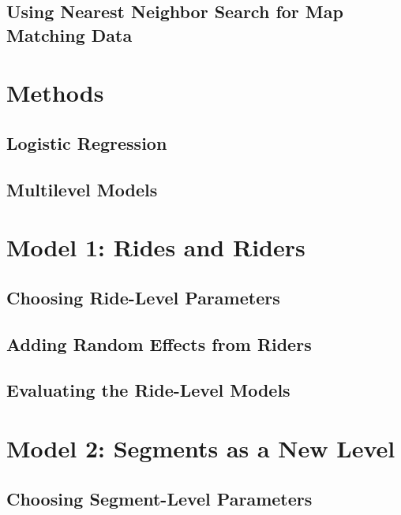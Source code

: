 \documentclass[12pt,twoside]{reedthesis}
\begin{document}
  \section{Using Nearest Neighbor Search for Map Matching
  Data}\label{using-nearest-neighbor-search-for-map-matching-data}
  
  \chapter{Methods}\label{methods}
  
  \section{Logistic Regression}\label{logistic-regression}
  
  \section{Multilevel Models}\label{multilevel-models}
  
  \chapter{Model 1: Rides and Riders}\label{model-1-rides-and-riders}
  
  \section{Choosing Ride-Level
  Parameters}\label{choosing-ride-level-parameters}
  
  \section{Adding Random Effects from
  Riders}\label{adding-random-effects-from-riders}
  
  \section{Evaluating the Ride-Level
  Models}\label{evaluating-the-ride-level-models}
  
  \chapter{Model 2: Segments as a New
  Level}\label{model-2-segments-as-a-new-level}
  
  \section{Choosing Segment-Level
  Parameters}\label{choosing-segment-level-parameters}
  
\end{document}
